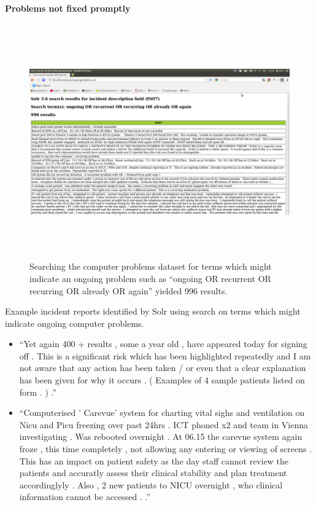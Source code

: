\paragraph{Problems not fixed promptly}


\begin{figure}[htp]
\centering
\includegraphics[width=15cm,height=10cm]{figs/ongoingproblems.png}
\caption{Searching the computer problems dataset for terms which might indicate an ongoing problem such as ``ongoing OR recurrent OR recurring OR already OR again'' yielded 996 results.}\label{fig:ongoingproblems}
\end{figure}

Example incident reports identified by Solr using search on terms which might indicate ongoing computer problems.
\begin{itemize}
 \item ``Yet again 400 + results , some a year old , have appeared today for signing off . This is a significant risk which has been highlighted repeatedly and I am not aware that any action has been taken / or even that a clear explanation has been given for why it occurs . ( Examples of 4 sample patients listed on form . ) .''
 \item ``Computerised ' Carevue' system for charting vital sighs and ventilation on Nicu and Picu freezing over past 24hrs . ICT phoned x2 and team in Vienna investigating . Was rebooted overnight . At 06.15 the carevue system again froze , this time completely , not allowing any entering or viewing of screens . This has an impact on patient safety as the day staff cannot review the patients and accuratly assess their clinical stability and plan treatment accordinglyly . Also , 2 new patients to NICU overnight , who clinical information cannot be accessed . .''
\end{itemize}


